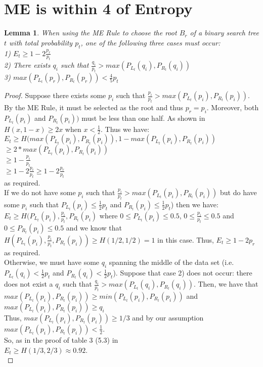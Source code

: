 \documentclass[letterpaper,12pt,titlepage,oneside,final]{book}
\theoremstyle{plain}
\newtheorem{lem}[thm]{Lemma}
\begin{document}
\section{ME is within 4 of Entropy}

\begin{lem}
When using the ME Rule to choose the root $B_r$ of a binary search tree $t$ with total probability $p_t$, one of the following three cases must occur: \\
1) $E_t \geq 1-2 \frac{p_r}{p_t}$ \\
2) There exists $q_i$ such that $\frac{q_i}{p_t} > max(P_{L_t}(q_i), P_{R_t}(q_i))$\\
3)  $max(P_{L_t}(p_r), P_{R_t}(p_r)) < \frac{4}{5} p_t$\\
\end{lem}
\begin{proof}
Suppose there exists some $p_i$ such that $\frac{p_i}{p_t} > max(P_{L_t}(p_i), P_{R_t}(p_i))$. By the ME Rule, it must be selected as the root and thus $p_r=p_i$. Moreover, both $P_{L_t}(p_i)$ and $P_{R_t}(p_i))$ must be less than one half. As shown in \cite{gallager1968information} $H(x,1-x) \geq 2x$ when $x<\frac{1}{2}$. Thus we have: \\
$E_t \geq H( max(P_{L_t}(p_i), P_{R_t}(p_i)), 1-max(P_{L_t}(p_i), P_{R_t}(p_i))$ \\
$ \geq 2*max(P_{L_t}(p_i), P_{R_t}(p_i))$ \\ $ \geq 1-\frac{p_i}{p_t}$ \\ 
$ \geq 1-2 \frac{p_i}{p_t} \geq 1-2 \frac{p_r}{p_t}$ \\
 as required. \\
 
 If we do not have some $p_i$ such that $\frac{p_i}{p_t} > max(P_{L_t}(p_i), P_{R_t}(p_i))$ but do have some $p_i$ such that $P_{L_t}(p_i) \leq \frac{1}{2}p_t$ and $P_{R_t}(p_i) \leq \frac{1}{2}p_t$) then we have: \\
 $E_t \geq H(P_{L_t}(p_i), \frac{p_i}{p_t} , P_{R_t}(p_i)$ where $0 \leq P_{L_t}(p_i) \leq 0.5$, $0 \leq \frac{p_i}{p_t} \leq 0.5$ and $0 \leq P_{R_t}(p_i) \leq 0.5$  and we know that \\
 $H(P_{L_t}(p_i), \frac{p_i}{p_t} , P_{R_t}(p_i)) \geq H(1/2, 1/2) = 1$ in this case.
 Thus, $E_t \geq 1-2p_r$ as required. \\
 
 Otherwise, we must have some $q_i$ spanning the middle of the data set (i.e. $P_{L_t}(q_i) < \frac{1}{2}p_t$ and $P_{R_t}(q_i) < \frac{1}{2}p_t$). Suppose that case 2) does not occur: there does not exist a $q_i$ such that $\frac{q_i}{p_t} > max(P_{L_t}(q_i), P_{R_t}(q_i))$. Then, we have that \\ $max(P_{L_t}(p_i), P_{R_t}(p_i)) \geq min(P_{L_t}(p_i), P_{R_t}(p_i))$ and \\ $max(P_{L_t}(p_i), P_{R_t}(p_i)) \geq q_i$ \\ Thus, $max(P_{L_t}(p_i), P_{R_t}(p_i)) \geq 1/3$ and by our assumption $max(P_{L_t}(p_i), P_{R_t}(p_i)) < \frac{1}{2}$. \\
 So, as in the proof of table 3 (5.3) in \cite{guttler1980binary}\\
 $E_t \geq H(1/3, 2/3) \approx 0.92$. \\


\end{proof}
\end{document}
